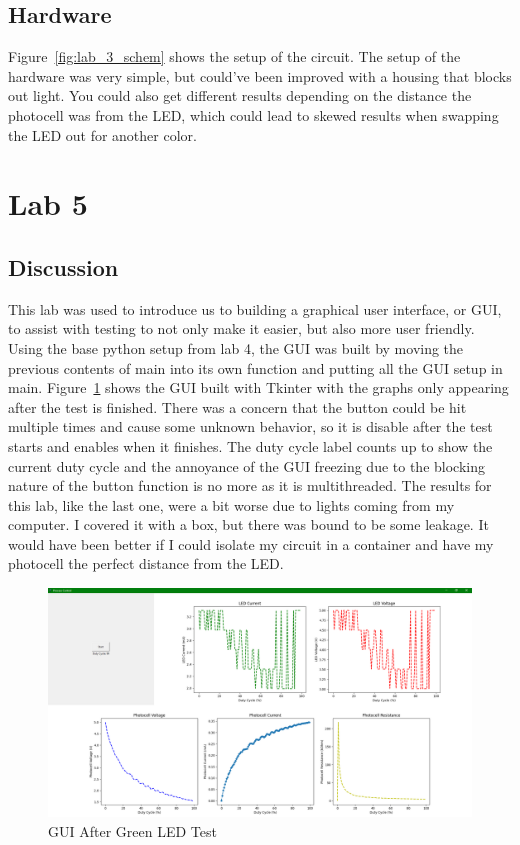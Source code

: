 \documentclass[12pt,titlepage]{article}
\begin{document}
\subsection{Hardware}
Figure~\ref{fig:lab_3_schem} shows the setup of the circuit. The setup of the hardware was very simple, but
could've been improved with a housing that blocks out light. You could also get different results depending
on the distance the photocell was from the LED, which could lead to skewed results when swapping the LED out
for another color.

\section{Lab 5}
\subsection{Discussion}
This lab was used to introduce us to building a graphical user interface, or GUI, to assist with testing to not only make it easier, but also more user friendly. Using the
base python setup from lab 4, the GUI was built by moving the previous contents of main into its own function and putting all the GUI setup in main.
Figure~\ref{fig:gui} shows the GUI built with Tkinter with the graphs only appearing after the test is finished.
There was a concern that the button could be hit multiple times and cause some unknown behavior, so it is disable after the test starts and enables when it finishes. The duty cycle
label counts up to show the current duty cycle and the annoyance of the GUI freezing due to the blocking nature of the button function is no more as it is multithreaded.
The results for this lab, like the last one, were a bit worse due to lights coming from my computer. I covered it with a box, but there was bound to be some leakage.
It would have been better if I could isolate my circuit in a container and have my photocell the perfect distance from the LED.
\begin{figure}[!htb]
  \centering
  \includegraphics[width=5in]{lab_5/gui.png}
  \caption{GUI After Green LED Test}\label{fig:gui}
\end{figure}
\end{document}
